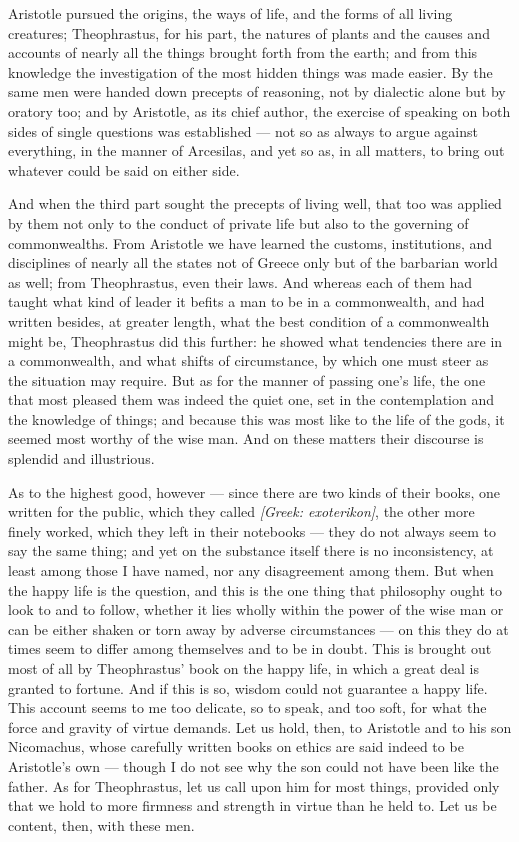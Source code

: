 Aristotle pursued the origins, the ways of life, and the forms of all living creatures; Theophrastus, for his part, the natures of plants and the causes and accounts of nearly all the things brought forth from the earth; and from this knowledge the investigation of the most hidden things was made easier. By the same men were handed down precepts of reasoning, not by dialectic alone but by oratory too; and by Aristotle, as its chief author, the exercise of speaking on both sides of single questions was established — not so as always to argue against everything, in the manner of Arcesilas, and yet so as, in all matters, to bring out whatever could be said on either side.

 And when the third part sought the precepts of living well, that too was applied by them not only to the conduct of private life but also to the governing of commonwealths. From Aristotle we have learned the customs, institutions, and disciplines of nearly all the states not of Greece only but of the barbarian world as well; from Theophrastus, even their laws. And whereas each of them had taught what kind of leader it befits a man to be in a commonwealth, and had written besides, at greater length, what the best condition of a commonwealth might be, Theophrastus did this further: he showed what tendencies there are in a commonwealth, and what shifts of circumstance, by which one must steer as the situation may require. But as for the manner of passing one's life, the one that most pleased them was indeed the quiet one, set in the contemplation and the knowledge of things; and because this was most like to the life of the gods, it seemed most worthy of the wise man. And on these matters their discourse is splendid and illustrious.

 As to the highest good, however — since there are two kinds of their books, one written for the public, which they called \textit{[Greek: exoterikon]}, the other more finely worked, which they left in their notebooks — they do not always seem to say the same thing; and yet on the substance itself there is no inconsistency, at least among those I have named, nor any disagreement among them. But when the happy life is the question, and this is the one thing that philosophy ought to look to and to follow, whether it lies wholly within the power of the wise man or can be either shaken or torn away by adverse circumstances — on this they do at times seem to differ among themselves and to be in doubt. This is brought out most of all by Theophrastus' book on the happy life, in which a great deal is granted to fortune. And if this is so, wisdom could not guarantee a happy life. This account seems to me too delicate, so to speak, and too soft, for what the force and gravity of virtue demands. Let us hold, then, to Aristotle and to his son Nicomachus, whose carefully written books on ethics are said indeed to be Aristotle's own — though I do not see why the son could not have been like the father. As for Theophrastus, let us call upon him for most things, provided only that we hold to more firmness and strength in virtue than he held to. Let us be content, then, with these men.


